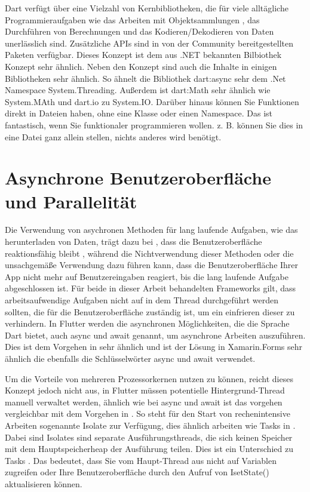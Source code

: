 Dart verfügt über eine Vielzahl von Kernbibliotheken, die für viele alltägliche Programmieraufgaben wie das Arbeiten mit Objektsammlungen , das Durchführen von Berechnungen und das Kodieren/Dekodieren von Daten  unerlässlich sind.  Zusätzliche APIs sind in von der Community bereitgestellten Paketen verfügbar. Dieses Konzept ist dem aus .NET bekannten Bilbiothek Konzept sehr ähnlich.
Neben den Konzept sind auch die Inhalte in einigen Bibliotheken sehr ähnlich. So ähnelt die Bibliothek dart:async sehr dem .Net Namespace System.Threading.  Außerdem ist dart:Math sehr ähnlich wie System.MAth und dart.io zu System.IO.
Darüber hinaus können Sie Funktionen direkt in Dateien haben, ohne eine Klasse oder einen Namespace. Das ist fantastisch, wenn Sie funktionaler programmieren wollen. z. B. können Sie dies in eine Datei ganz allein stellen, nichts anderes wird benötigt.

\section{Asynchrone Benutzeroberfläche und Parallelität}

Die Verwendung von asychronen Methoden für lang laufende Aufgaben, wie das herunterladen von Daten, trägt dazu bei , dass die Benutzeroberfläche reaktionsfähig bleibt , während die Nichtverwendung dieser Methoden oder die unsachgemäße Verwendung dazu führen kann,  dass die Benutzeroberfläche Ihrer App nicht mehr auf Benutzereingaben reagiert, bis die lang laufende Aufgabe abgeschlossen ist.  Für beide in dieser Arbeit behandelten Frameworks gilt,  dass arbeitsaufwendige Aufgaben nicht auf in dem Thread durchgeführt werden sollten,  die für die Benutzeroberfläche zuständig ist, um ein einfrieren dieser zu verhindern. 
In Flutter werden die asynchronen Möglichkeiten, die die Sprache Dart bietet, auch \glq async\grq{} und \glq await\grq{}  genannt, um asynchrone Arbeiten auszuführen. Dies ist dem Vorgehen in \Csharp sehr ähnlich und ist der Lösung in Xamarin.Forms sehr ähnlich die ebenfalls die Schlüsselwörter  \glq async\grq{} und \glq await\grq{}  verwendet. 

Um die Vorteile von mehreren Prozessorkernen nutzen zu können,  reicht dieses Konzept jedoch nicht aus,  in Flutter müssen potentielle Hintergrund-Thread manuell verwaltet werden,  ähnlich wie bei \glq async\grq{} und \glq await\grq{}  ist das vorgehen vergleichbar mit dem Vorgehen in \Csharp. So steht für den Start von rechenintensive Arbeiten sogenannte \glq Isolate\grq{} zur Verfügung,   dies ähnlich arbeiten wie Tasks in \Csharp. Dabei sind \glq Isolates \grq{}  sind separate Ausführungsthreads, die sich keinen Speicher mit dem Hauptspeicherheap der Ausführung teilen.  Dies ist ein Unterschied zu \glq Tasks\grq{} .  Das bedeutet, dass Sie vom Haupt-Thread aus nicht auf Variablen zugreifen oder Ihre Benutzeroberfläche durch den Aufruf von \glq IsetState()\grq{}  aktualisieren können.

